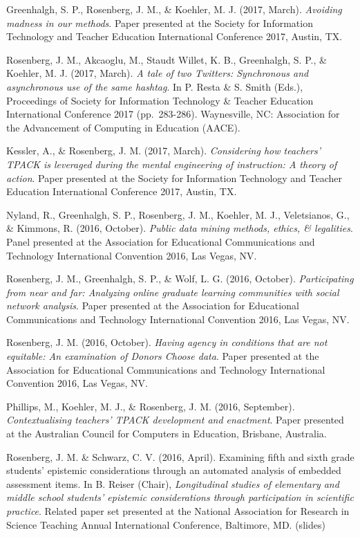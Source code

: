 \documentclass[14,]{article}
\begin{document}
Greenhalgh, S. P., Rosenberg, J. M., \& Koehler, M. J. (2017, March).
\emph{Avoiding madness in our methods}. Paper presented at the Society
for Information Technology and Teacher Education International
Conference 2017, Austin, TX.

Rosenberg, J. M., Akcaoglu, M., Staudt Willet, K. B., Greenhalgh, S. P.,
\& Koehler, M. J. (2017, March). \emph{A tale of two Twitters:
Synchronous and asynchronous use of the same hashtag}. In P. Resta \& S.
Smith (Eds.), Proceedings of Society for Information Technology \&
Teacher Education International Conference 2017 (pp.~283-286).
Waynesville, NC: Association for the Advancement of Computing in
Education (AACE).

Kessler, A., \& Rosenberg, J. M. (2017, March). \emph{Considering how
teachers' TPACK is leveraged during the mental engineering of
instruction: A theory of action}. Paper presented at the Society for
Information Technology and Teacher Education International Conference
2017, Austin, TX.

Nyland, R., Greenhalgh, S. P., Rosenberg, J. M., Koehler, M. J.,
Veletsianos, G., \& Kimmons, R. (2016, October). \emph{Public data
mining methods, ethics, \& legalities}. Panel presented at the
Association for Educational Communications and Technology International
Convention 2016, Las Vegas, NV.

Rosenberg, J. M., Greenhalgh, S. P., \& Wolf, L. G. (2016, October).
\emph{Participating from near and far: Analyzing online graduate
learning communities with social network analysis}. Paper presented at
the Association for Educational Communications and Technology
International Convention 2016, Las Vegas, NV.

Rosenberg, J. M. (2016, October). \emph{Having agency in conditions that
are not equitable: An examination of Donors Choose data}. Paper
presented at the Association for Educational Communications and
Technology International Convention 2016, Las Vegas, NV.

Phillips, M., Koehler, M. J., \& Rosenberg, J. M. (2016, September).
\emph{Contextualising teachers' TPACK development and enactment}. Paper
presented at the Australian Council for Computers in Education,
Brisbane, Australia.

Rosenberg, J. M. \& Schwarz, C. V. (2016, April). Examining fifth and
sixth grade students' epistemic considerations through an automated
analysis of embedded assessment items. In B. Reiser (Chair),
\emph{Longitudinal studies of elementary and middle school students'
epistemic considerations through participation in scientific practice}.
Related paper set presented at the National Association for Research in
Science Teaching Annual International Conference, Baltimore, MD.
(slides)
\end{document}
